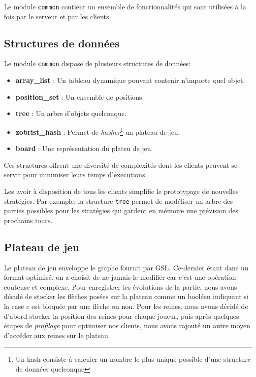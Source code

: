 Le module \verb|common| contient un ensemble de fonctionnalités qui sont 
utilisées à la fois par le serveur et par les clients. 

\subsection{Structures de données}
Le module \verb|common| dispose de plusieurs structures de données:
\begin{itemize}
    \item \textbf{array\_list} : Un tableau dynamique pouvant contenir n'importe quel objet.
    \item \textbf{position\_set} : Un ensemble de positions.
    \item \textbf{tree} : Un arbre d'objets quelconque.
    \item \textbf{zobrist\_hash} : Permet de \textit{hasher}\footnote{Un hash consiste à calculer un nombre le plus unique possible d'une structure de données quelconque} un plateau de jeu.
    \item \textbf{board} : Une représentation du plateu de jeu.
\end{itemize}

Ces structures offrent une diversité de complexités dont les clients 
peuvent se servir pour minimiser leurs temps d'éxecutions.

Les avoir à disposition de tous les clients simplifie le prototypage de nouvelles stratégies.
Par exemple, la structure \verb|tree| permet de modéliser un arbre des parties possibles pour les 
stratégies qui gardent en mémoire une prévision des prochains tours.

\subsection{Plateau de jeu}
Le plateau de jeu enveloppe le graphe fournit par GSL.
Ce-dernier étant dans un format optimisé, on a choisit de ne jamais 
le modifier car c'est une opération couteuse et complexe. Pour 
enregistrer les évolutions de la partie, nous avons décidé de stocker les
flèches posées sur la plateau comme un booléen indiquant si la case $c$ est bloquée par une flèche ou non.
Pour les reines, nous avons décidé de d'abord stocker la position des reines pour chaque joueur,
puis après quelques étapes de \emph{profilage} pour optimiser nos clients, nous avons rajouté
un autre moyen d'accéder aux reines sur le plateau.